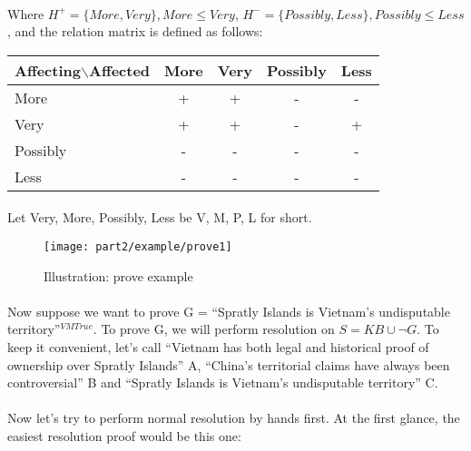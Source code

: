 \documentclass[../gr-final.tex]{subfiles}
\begin{document}
\paragraph{} Where $H^{+} =
\{More, Very\}, More \le Very$, $H^{-} = \{Possibly, Less\},
Possibly \le Less$, and the relation matrix is defined as follows:
\begin{tabular}{|l|c|c|c|c|}
\hline
            Affecting$\backslash$Affected & More & Very & Possibly & Less \\ \hline
            More                        & +    & +    & -    & -    \\ \hline
            Very                        & +    & +    & -    & +    \\ \hline
            Possibly                    & -    & -    & -    & -    \\ \hline
            Less                        & -    & -    & -    & -    \\ \hline
\end{tabular}
\paragraph{} Let Very, More, Possibly, Less be V, M, P, L for
short.


\begin{figure}[H]
  \centering
  \texttt{[image: part2/example/prove1]}
  \caption{Illustration: prove example}
\end{figure}
\paragraph{} Now suppose we want to prove G = 
``Spratly Islands is Vietnam's undisputable
territory''$^{VMTrue}$. To prove G, we will
perform resolution on $S = KB \cup \neg{G}$. 
To keep it convenient, let's call ``Vietnam has both legal and
historical proof of ownership over Spratly Islands'' A, ``China's
territorial claims have always been controversial'' B and
``Spratly Islands is Vietnam's undisputable territory'' C.

\paragraph{} Now let's try to perform normal resolution by hands
first. At the first glance, the easiest resolution proof
would be this one:
\end{document}
